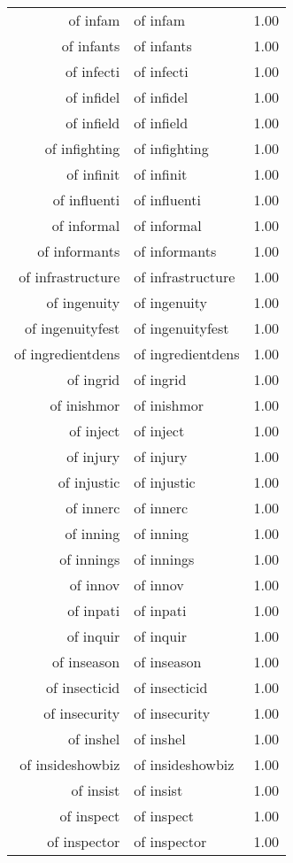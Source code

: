 \begin{table}[ht]
\begin{tabular}{rlr}
  of infam & of infam & 1.00 \\ 
  of infants & of infants & 1.00 \\ 
  of infecti & of infecti & 1.00 \\ 
  of infidel & of infidel & 1.00 \\ 
  of infield & of infield & 1.00 \\ 
  of infighting & of infighting & 1.00 \\ 
  of infinit & of infinit & 1.00 \\ 
  of influenti & of influenti & 1.00 \\ 
  of informal & of informal & 1.00 \\ 
  of informants & of informants & 1.00 \\ 
  of infrastructure & of infrastructure & 1.00 \\ 
  of ingenuity & of ingenuity & 1.00 \\ 
  of ingenuityfest & of ingenuityfest & 1.00 \\ 
  of ingredientdens & of ingredientdens & 1.00 \\ 
  of ingrid & of ingrid & 1.00 \\ 
  of inishmor & of inishmor & 1.00 \\ 
  of inject & of inject & 1.00 \\ 
  of injury & of injury & 1.00 \\ 
  of injustic & of injustic & 1.00 \\ 
  of innerc & of innerc & 1.00 \\ 
  of inning & of inning & 1.00 \\ 
  of innings & of innings & 1.00 \\ 
  of innov & of innov & 1.00 \\ 
  of inpati & of inpati & 1.00 \\ 
  of inquir & of inquir & 1.00 \\ 
  of inseason & of inseason & 1.00 \\ 
  of insecticid & of insecticid & 1.00 \\ 
  of insecurity & of insecurity & 1.00 \\ 
  of inshel & of inshel & 1.00 \\ 
  of insideshowbiz & of insideshowbiz & 1.00 \\ 
  of insist & of insist & 1.00 \\ 
  of inspect & of inspect & 1.00 \\ 
  of inspector & of inspector & 1.00 \\ 

\end{tabular}
\end{table}
